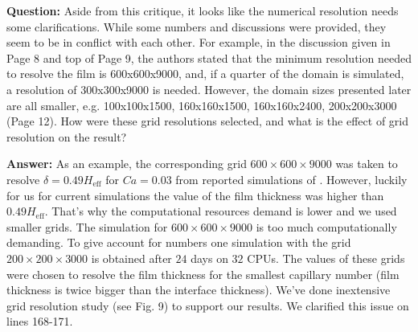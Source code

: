 \documentclass{article}
\begin{document}
\textbf{Question:} Aside from this critique, it looks like the numerical resolution needs some clarifications.  While
some numbers and discussions were provided, they seem to be in conflict with each other.  For
example, in the discussion given in Page 8 and top of Page 9, the authors stated that the minimum
resolution needed to resolve the film is 600x600x9000, and, if a quarter of the domain is simulated,
a resolution of 300x300x9000 is needed.  However, the domain sizes presented later are all smaller,
e.g. 100x100x1500, 160x160x1500, 160x160x2400, 200x200x3000 (Page 12).  How were these grid
resolutions selected, and what is the effect of grid resolution on the result?

\textbf{Answer:} As an example, the corresponding grid $600\times600\times9000$ was taken to resolve
$\delta=0.49 H_{\mathrm{eff}}$ for $Ca=0.03$ from reported simulations of \citet{heil-threedim}.
However, luckily for us for current simulations the value of the film thickness was higher
than $0.49 H_{\mathrm{eff}}$. That's why the computational resources demand is lower and we used
smaller grids. The simulation for $600\times 600 \times 9000$ is too much computationally demanding.
To give account for numbers one simulation with the grid $200\times200\times 3000$ is obtained after
$24$ days on $32$ CPUs. The values of these grids were chosen to resolve the film thickness for the
smallest capillary number (film thickness is twice bigger than the interface thickness). We've done
inextensive grid resolution study (see Fig. 9) to support our results.  We clarified
this issue on lines 168-171. 
\end{document}

